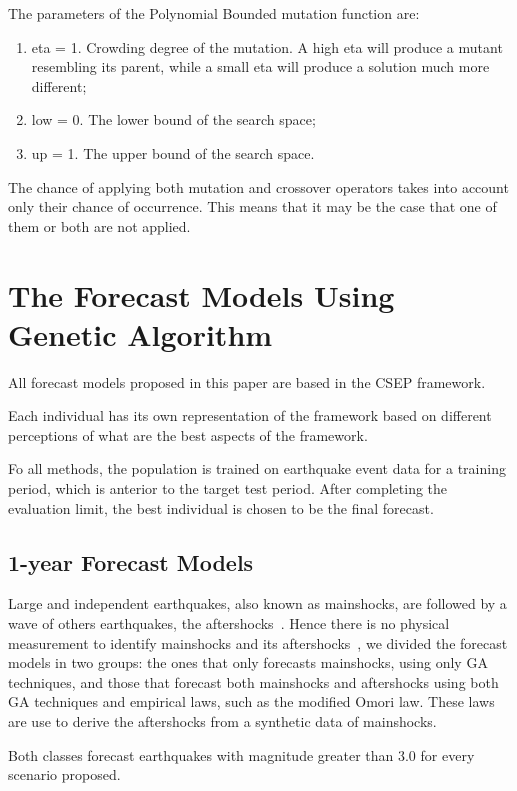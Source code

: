 The parameters of the Polynomial Bounded mutation function are: 
\begin{enumerate}
	\item eta = 1. Crowding degree of the mutation. A high eta will produce a mutant resembling its parent, while a small eta will produce a solution much more different;
	\item low = 0. The lower bound of the search space;
	\item up = 1. The upper bound of the search space.
\end{enumerate}

The chance of applying both mutation and crossover operators takes into account only their chance of occurrence. This means that it may be the case that one of them or both are not applied.

\section{The Forecast Models Using Genetic Algorithm}\label{Models}

All forecast models proposed in this paper are based in the
CSEP framework.

Each individual has its own representation of the framework based on
different perceptions of what are the best aspects of the framework.

Fo all methods, the population is trained on earthquake event data for a training
period, which is anterior to the target test period. After completing
the evaluation limit, the best individual is chosen to be the final
forecast.

\subsection{1-year Forecast Models}
Large and independent earthquakes, also known as mainshocks, are
followed by a wave of others earthquakes, the
aftershocks~\cite{schorlemmer2010first}. Hence there is no physical
measurement to identify mainshocks and its
aftershocks~\cite{schorlemmer2010first}, we divided the forecast
models in two groups: the ones that only forecasts mainshocks, using only GA techniques, and those that forecast both mainshocks and aftershocks using both GA techniques and empirical laws, such as the modified Omori law. These laws are use to derive the aftershocks from a synthetic data of mainshocks. 

Both classes forecast earthquakes with magnitude greater than 3.0 for
every scenario proposed.%


